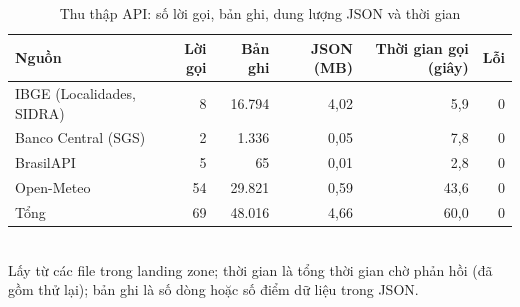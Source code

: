 \begin{table}[htbp]\centering\scriptsize\caption{Thu thập API: số lời gọi, bản ghi, dung lượng JSON và thời gian}\label{tab:api-calls}
\begin{tabular}{lrrrrr}\toprule
\textbf{Nguồn} & \textbf{Lời gọi} & \textbf{Bản ghi} & \textbf{JSON (MB)} & \textbf{Thời gian gọi (giây)} & \textbf{Lỗi} \\\midrule
IBGE (Localidades, SIDRA) & 8 & 16.794 & 4,02 & 5,9 & 0 \\
Banco Central (SGS) & 2 & 1.336 & 0,05 & 7,8 & 0 \\
BrasilAPI & 5 & 65 & 0,01 & 2,8 & 0 \\
Open-Meteo & 54 & 29.821 & 0,59 & 43,6 & 0 \\
Tổng & 69 & 48.016 & 4,66 & 60,0 & 0 \\
\bottomrule\end{tabular}\\[2pt]{\footnotesize Lấy từ các file  trong landing zone; thời gian là tổng thời gian chờ phản hồi (đã gồm thử lại); bản ghi là số dòng hoặc số điểm dữ liệu trong JSON.}
\end{table}
